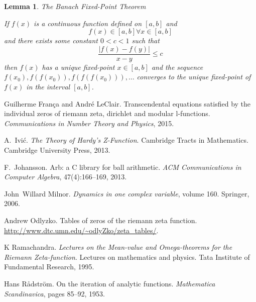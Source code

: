 \documentclass{elsarticle}
\newcommand{\tmtextit}[1]{{\itshape{#1}}}
\newtheorem{lemma}{Lemma}
{\theorembodyfont{\rmfamily}\newtheorem{note}{Note}}
\begin{document}
\begin{lemma}
  The Banach Fixed-Point Theorem
  
  If $f (x)$ is a continuous function defined on $[a, b]$ and
  \begin{equation}
    f (x) \in [a, b] \forall x \in [a, b]
  \end{equation}
  and there exists some constant $0 < c < 1$ such that
  \begin{equation}
    \text{$\frac{| f (x) - f (y) |}{x - y} \leqslant c$} \label{lc}
  \end{equation}
  then $f (x)$ has a unique fixed-point $x \in [a, b]$ and the sequence $f
  (x_0), f (f (x_0)), f (f (f (x_0))), \ldots$ converges to the unique
  fixed-point of $f (x)$ in the interval $[a, b]$.
\end{lemma}

\begin{thebibliography}{1}
  Guilherme Fran{\c c}a  and  Andr{\'e} LeClair.{\newblock}
  Transcendental equations satisfied by the individual zeros of riemann
  zeta, dirichlet and modular l-functions.{\newblock}
  \tmtextit{Communications in Number Theory and Physics}, 2015.{\newblock}
  
  A.~Ivi{\'c}.{\newblock} \tmtextit{The Theory of Hardy's
  Z-Function}.{\newblock} Cambridge Tracts in Mathematics. Cambridge
  University Press, 2013.{\newblock}
  
  F.~Johansson.{\newblock} Arb: a C library for
  ball arithmetic.{\newblock} \tmtextit{ACM Communications in Computer
  Algebra}, 47(4):166--169, 2013.{\newblock}
  
  John~Willard Milnor.{\newblock}
  \tmtextit{Dynamics in one complex variable},  volume  160.{\newblock}
  Springer, 2006.{\newblock}
  
  Andrew Odlyzko.{\newblock} Tables of zeros of the riemann
  zeta function.{\newblock}
  \url{http://www.dtc.umn.edu/~odlyZko/zeta_tables/}.{\newblock}
  
  K Ramachandra.{\newblock}
  \tmtextit{Lectures on the Mean-value and Omega-theorems for the Riemann
  Zeta-function}.{\newblock} Lectures on mathematics and physics. Tata
  Institute of Fundamental Research, 1995.{\newblock}
  
  Hans R{\r a}dstr{\"o}m.{\newblock} On the
  iteration of analytic functions.{\newblock} \tmtextit{Mathematica
  Scandinavica},  pages  85--92, 1953.{\newblock}
\end{thebibliography}
\end{document}
